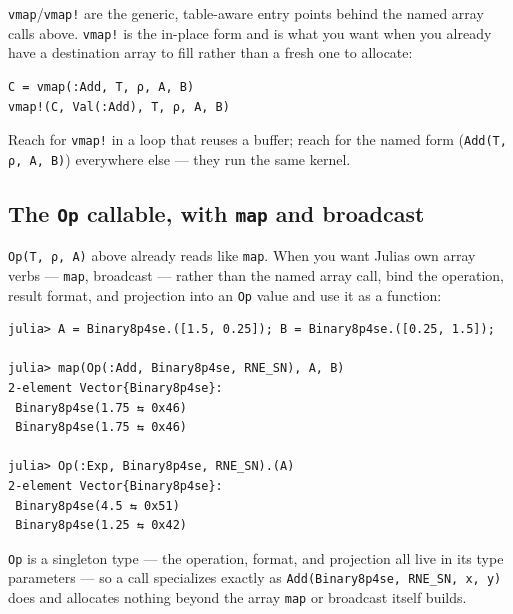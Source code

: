 \label{5255729870829091668}{}


\texttt{vmap}/\allowbreak\texttt{vmap!} are the generic, table-aware entry points behind the named array calls above. \texttt{vmap!} is the in-place form and is what you want when you already have a destination array to fill rather than a fresh one to allocate:




\nopagebreak[4]
\begin{verbatim}
C = vmap(:Add, T, ρ, A, B)
vmap!(C, Val(:Add), T, ρ, A, B)
\end{verbatim}



Reach for \texttt{vmap!} in a loop that reuses a buffer; reach for the named form (\texttt{Add(T, ρ, A, B)}) everywhere else — they run the same kernel.



\subsection{The \texttt{Op} callable, with \texttt{map} and broadcast}



\label{3754941402779852898}{}


\texttt{Op(T, ρ, A)} above already reads like \texttt{map}. When you want Julia{\textquotesingle}s own array verbs — \texttt{map}, broadcast — rather than the named array call, bind the operation, result format, and projection into an \texttt{Op} value and use it as a function:




\nopagebreak[4]
\begin{verbatim}
julia> A = Binary8p4se.([1.5, 0.25]); B = Binary8p4se.([0.25, 1.5]);

julia> map(Op(:Add, Binary8p4se, RNE_SN), A, B)
2-element Vector{Binary8p4se}:
 Binary8p4se(1.75 ⇆ 0x46)
 Binary8p4se(1.75 ⇆ 0x46)

julia> Op(:Exp, Binary8p4se, RNE_SN).(A)
2-element Vector{Binary8p4se}:
 Binary8p4se(4.5 ⇆ 0x51)
 Binary8p4se(1.25 ⇆ 0x42)
\end{verbatim}



\texttt{Op} is a singleton type — the operation, format, and projection all live in its type parameters — so a call specializes exactly as \texttt{Add(\allowbreak{}Binary8p4se, RNE\_\allowbreak{}SN, x, y)} does and allocates nothing beyond the array \texttt{map} or broadcast itself builds.



